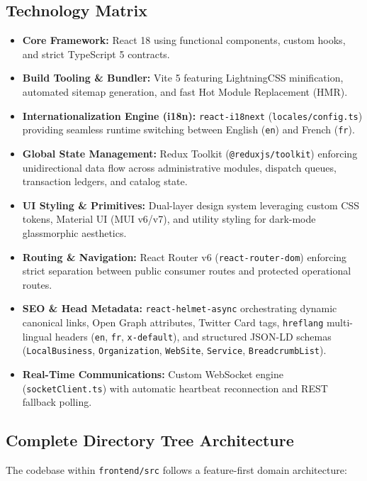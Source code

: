 \documentclass[11pt,a4paper]{article}
\begin{document}
\subsection{Technology Matrix}
\begin{itemize}
    \item \textbf{Core Framework:} React 18 using functional components, custom hooks, and strict TypeScript 5 contracts.
    \item \textbf{Build Tooling \& Bundler:} Vite 5 featuring LightningCSS minification, automated sitemap generation, and fast Hot Module Replacement (HMR).
    \item \textbf{Internationalization Engine (i18n):} \texttt{react-i18next} (\texttt{locales/config.ts}) providing seamless runtime switching between English (\texttt{en}) and French (\texttt{fr}).
    \item \textbf{Global State Management:} Redux Toolkit (\texttt{@reduxjs/toolkit}) enforcing unidirectional data flow across administrative modules, dispatch queues, transaction ledgers, and catalog state.
    \item \textbf{UI Styling \& Primitives:} Dual-layer design system leveraging custom CSS tokens, Material UI (MUI v6/v7), and utility styling for dark-mode glassmorphic aesthetics.
    \item \textbf{Routing \& Navigation:} React Router v6 (\texttt{react-router-dom}) enforcing strict separation between public consumer routes and protected operational routes.
    \item \textbf{SEO \& Head Metadata:} \texttt{react-helmet-async} orchestrating dynamic canonical links, Open Graph attributes, Twitter Card tags, \texttt{hreflang} multi-lingual headers (\texttt{en}, \texttt{fr}, \texttt{x-default}), and structured JSON-LD schemas (\texttt{LocalBusiness}, \texttt{Organization}, \texttt{WebSite}, \texttt{Service}, \texttt{BreadcrumbList}).
    \item \textbf{Real-Time Communications:} Custom WebSocket engine (\texttt{socketClient.ts}) with automatic heartbeat reconnection and REST fallback polling.
\end{itemize}

\subsection{Complete Directory Tree Architecture}
The codebase within \texttt{frontend/src} follows a feature-first domain architecture:
\end{document}
